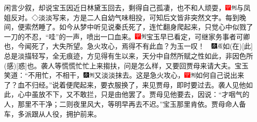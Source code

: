 闲言少叙，却说宝玉因近日林黛玉回去，剩得自己孤凄，也不和人顽耍，{\includegraphics[width=3mm]{../Images/00002}\includegraphics[width=3mm]{../Images/00011}\footnotesize \kaishu 与凤姐反对。◇淡淡写来，方是二人自幼气味相投，可知后文皆非突然文字。}每到晚间，便索然睡了。如今从梦中听见说秦氏死了，连忙翻身爬起来，只觉心中似戮了一刀的不忍，``哇''的一声，喷出一口血来。{{\includegraphics[width=3mm]{../Images/00002}\includegraphics[width=3mm]{../Images/00011}\footnotesize \kaishu 宝玉早已看定，可继家务事者可卿也，今闻死了，大失所望。急火攻心，焉得不有此血？为玉一叹！　\includegraphics[width=3mm]{../Images/00004}\includegraphics[width=3mm]{../Images/00010}\footnotesize \kaishu 如{(在)}{[}此{]}总是淡描轻写，全无痕迹，方见得有生以来，天分中自然所赋之性如此，非因色所{(感)}{[}惑{]}也。}}袭人等慌慌忙忙上来搊扶，问是怎么样，又要回贾母来请大夫。宝玉笑道：``不用忙，不相干，{\includegraphics[width=3mm]{../Images/00004}\includegraphics[width=3mm]{../Images/00011}\footnotesize \kaishu 又淡淡抹去。}这是急火攻心，{\includegraphics[width=3mm]{../Images/00002}\includegraphics[width=3mm]{../Images/00011}\footnotesize \kaishu 如何自己说出来了？}血不归经。''说着便爬起来，要衣服换了，来见贾母，即时要过去。袭人见他如此，心中虽放不下，又不敢拦，只是由他罢了。贾母见他要去，因说：``才咽气的人，那里不干净；二则夜里风大，等明早再去不迟。''宝玉那里肯依。贾母命人备车，多派跟从人役，拥护前来。

